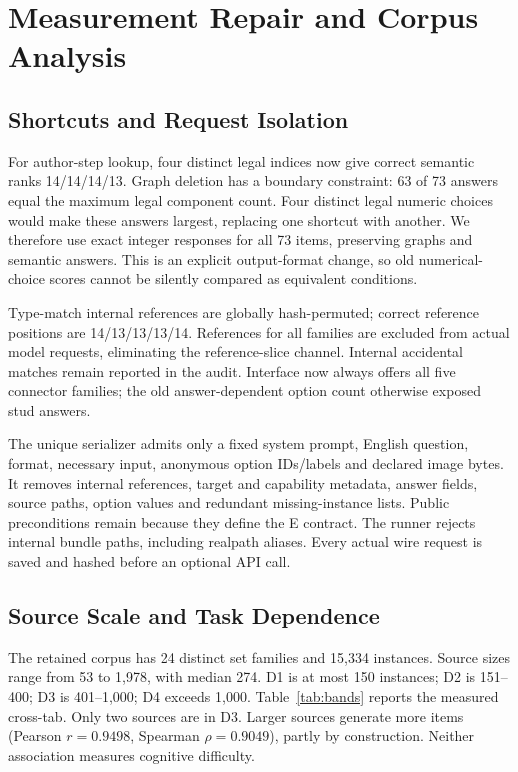 \documentclass[10pt,twocolumn,letterpaper]{article}
\begin{document}
\section{Measurement Repair and Corpus Analysis}
\subsection{Shortcuts and Request Isolation}
For author-step lookup, four distinct legal indices now give correct
semantic ranks 14/14/14/13. Graph deletion has a boundary constraint:
63 of 73 answers equal the maximum legal component count. Four
distinct legal numeric choices would make these answers largest,
replacing one shortcut with another. We therefore use exact integer
responses for all 73 items, preserving graphs and semantic answers.
This is an explicit output-format change, so old numerical-choice
scores cannot be silently compared as equivalent conditions.

Type-match internal references are globally hash-permuted; correct
reference positions are 14/13/13/13/14. References for all families are
excluded from actual model requests, eliminating the reference-slice
channel. Internal accidental matches remain reported in the audit.
Interface now always offers all five connector families; the old
answer-dependent option count otherwise exposed stud answers.

The unique serializer admits only a fixed system prompt, English
question, format, necessary input, anonymous option IDs/labels and
declared image bytes. It removes internal references, target and
capability metadata, answer fields, source paths, option values and
redundant missing-instance lists. Public preconditions remain because
they define the E contract. The runner rejects internal bundle paths,
including realpath aliases. Every actual wire request is saved and
hashed before an optional API call.

\subsection{Source Scale and Task Dependence}
The retained corpus has 24 distinct set families and 15,334 instances.
Source sizes range from 53 to 1,978, with median 274.
D1 is at most 150 instances; D2 is 151--400; D3 is 401--1,000;
D4 exceeds 1,000. Table~\ref{tab:bands} reports the measured cross-tab.
Only two sources are in D3. Larger sources generate more items
(Pearson $r=0.9498$, Spearman $\rho=0.9049$), partly by construction.
Neither association measures cognitive difficulty.
\end{document}
